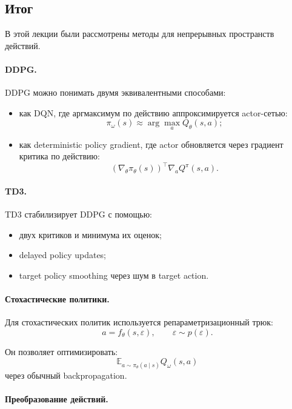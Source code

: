 \documentclass[12pt,a4paper]{article}
\begin{document}
\subsection{Итог}

В этой лекции были рассмотрены методы для непрерывных пространств действий.

\paragraph{DDPG.}

DDPG можно понимать двумя эквивалентными способами:

\begin{itemize}
    \item как DQN, где аргмаксимум по действию аппроксимируется actor-сетью:
    \[
    \pi_\omega(s)
    \approx
    \arg\max_a Q_\theta(s,a);
    \]

    \item как deterministic policy gradient, где actor обновляется через градиент критика по действию:
    \[
    \left(
    \nabla_\theta \pi_\theta(s)
    \right)^\top
    \nabla_a Q^\pi(s,a).
    \]
\end{itemize}

\paragraph{TD3.}

TD3 стабилизирует DDPG с помощью:

\begin{itemize}
    \item двух критиков и минимума их оценок;
    \item delayed policy updates;
    \item target policy smoothing через шум в target action.
\end{itemize}

\paragraph{Стохастические политики.}

Для стохастических политик используется репараметризационный трюк:
\[
a=f_\theta(s,\varepsilon),
\qquad
\varepsilon\sim p(\varepsilon).
\]

Он позволяет оптимизировать:
\[
\mathbb E_{a\sim\pi_\theta(a\mid s)}
Q_\omega(s,a)
\]
через обычный backpropagation.

\paragraph{Преобразование действий.}
\end{document}
